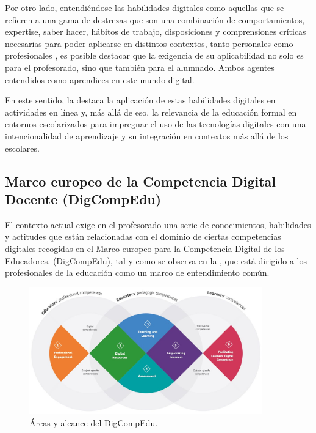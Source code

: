 \documentclass[spanish]{textolivre}
\begin{document}
Por otro lado, entendiéndose las habilidades digitales como aquellas que se refieren a una gama de destrezas que son una combinación de comportamientos, expertise, saber hacer, hábitos de trabajo, disposiciones y comprensiones críticas necesarias para poder aplicarse en distintos contextos, tanto personales como profesionales \cite{unesco_marco_2019}, es posible destacar que la exigencia de su aplicabilidad no solo es para el profesorado, sino que también para el alumnado. Ambos agentes entendidos como aprendices en este mundo digital.

En este sentido, la \textcite{unesco_marco_2019} destaca la aplicación de estas habilidades digitales en actividades en línea y, más allá de eso, la relevancia de la educación formal en entornos escolarizados para impregnar el uso de las tecnologías digitales con una intencionalidad de aprendizaje y su integración en contextos más allá de los escolares.


\subsection{Marco europeo de la Competencia Digital Docente (DigCompEdu)}

El contexto actual exige en el profesorado una serie de conocimientos, habilidades y actitudes que están relacionadas con el dominio de ciertas competencias digitales recogidas en el Marco europeo para la Competencia Digital de los Educadores. (DigCompEdu), tal y como se observa en la , que está dirigido a los profesionales de la educación como un marco de entendimiento común.

\begin{figure}
    \centering
    \includegraphics[width=0.9\textwidth]{fig01.png}
    \caption{Áreas y alcance del DigCompEdu.}
    \label{fig01}
\end{figure}
\end{document}
